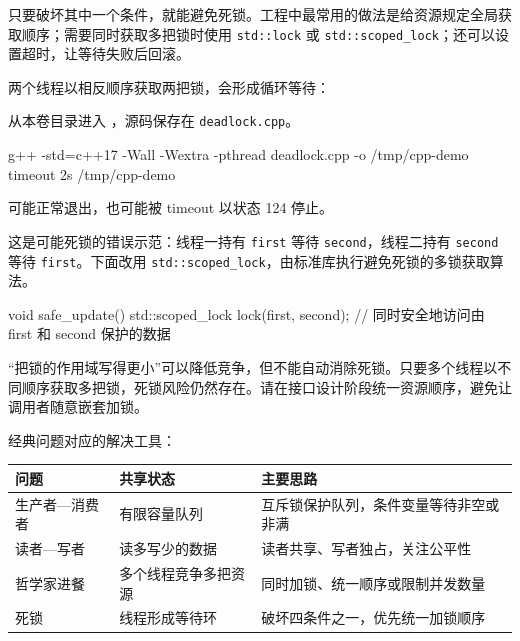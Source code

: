 只要破坏其中一个条件，就能避免死锁。工程中最常用的做法是给资源规定全局获取顺序；需要同时获取多把锁时使用 \texttt{std::lock} 或 \texttt{std::scoped\_lock}；还可以设置超时，让等待失败后回滚。

\begin{example}
两个线程以相反顺序获取两把锁，会形成循环等待：



从本卷目录进入 ，源码保存在 \texttt{deadlock.cpp}。
\begin{tbash}
g++ -std=c++17 -Wall -Wextra -pthread deadlock.cpp -o /tmp/cpp-demo
timeout 2s /tmp/cpp-demo
\end{tbash}
可能正常退出，也可能被 timeout 以状态 124 停止。
\end{example}

这是可能死锁的错误示范：线程一持有 \texttt{first} 等待 \texttt{second}，线程二持有 \texttt{second} 等待 \texttt{first}。下面改用 \texttt{std::scoped\_lock}，由标准库执行避免死锁的多锁获取算法。

\begin{tcode}
void safe_update() {
    std::scoped_lock lock(first, second);
    // 同时安全地访问由 first 和 second 保护的数据
}
\end{tcode}

\begin{note}
“把锁的作用域写得更小”可以降低竞争，但不能自动消除死锁。只要多个线程以不同顺序获取多把锁，死锁风险仍然存在。请在接口设计阶段统一资源顺序，避免让调用者随意嵌套加锁。
\end{note}

\begin{conclusion}
经典问题对应的解决工具：
\begin{center}
\begin{tabular}{p{2.7cm}p{3.5cm}p{5.5cm}}
\toprule[1.5pt]
问题 & 共享状态 & 主要思路 \\
\midrule[1pt]
生产者—消费者 & 有限容量队列 & 互斥锁保护队列，条件变量等待非空或非满 \\
读者—写者 & 读多写少的数据 & 读者共享、写者独占，关注公平性 \\
哲学家进餐 & 多个线程竞争多把资源 & 同时加锁、统一顺序或限制并发数量 \\
死锁 & 线程形成等待环 & 破坏四条件之一，优先统一加锁顺序 \\
\bottomrule[1.5pt]
\end{tabular}
\end{center}
\end{conclusion}

